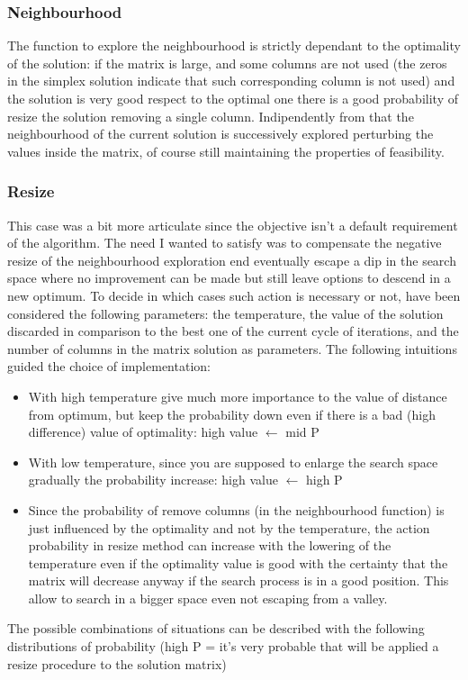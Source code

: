 ﻿\documentclass[a4paper]{article}
\begin{document}
\subsubsection{Neighbourhood}
The function to explore the neighbourhood is strictly dependant to the optimality of the solution: if the matrix is large, and some columns are not used (the zeros in the simplex solution indicate that such corresponding column is not used) and the solution is very good respect to the optimal one there is a good probability of resize the solution removing a single column. Indipendently from that the neighbourhood of the current solution is successively explored perturbing the values inside the matrix, of course still maintaining the properties of feasibility.
\subsubsection{Resize}
This case was a bit more articulate since the objective isn't a default requirement of the algorithm. The need I wanted to satisfy was to compensate the negative resize of the neighbourhood exploration end eventually escape a dip in the search space where no improvement can be made but still leave options to descend in a new optimum. To decide in which cases such action is necessary or not, have been considered the following parameters: the temperature, the value of the solution discarded in comparison to the best one of the current cycle of iterations, and the number of columns in the matrix solution as parameters. The following intuitions guided the choice of implementation:

\begin{itemize}
\item With high temperature give much more importance to the value of distance from optimum, but keep the probability down even if there is a bad (high difference) value of optimality: high value $\gets$ mid P
\item With low temperature, since you are supposed to enlarge the search space gradually the probability increase: high value $\gets$ high P
\item Since the probability of remove columns (in the neighbourhood function) is just influenced by the optimality and not by the temperature, the action probability in resize method can increase with the lowering of the temperature even if the optimality value is good with the certainty that the matrix will decrease anyway if the search process is in a good position. This allow to search in a bigger space even not escaping from a valley.

\end{itemize}
The possible combinations of situations can be described with the following distributions of probability (high P = it's very probable that will be applied a resize procedure to the solution matrix)\\
\end{document}

